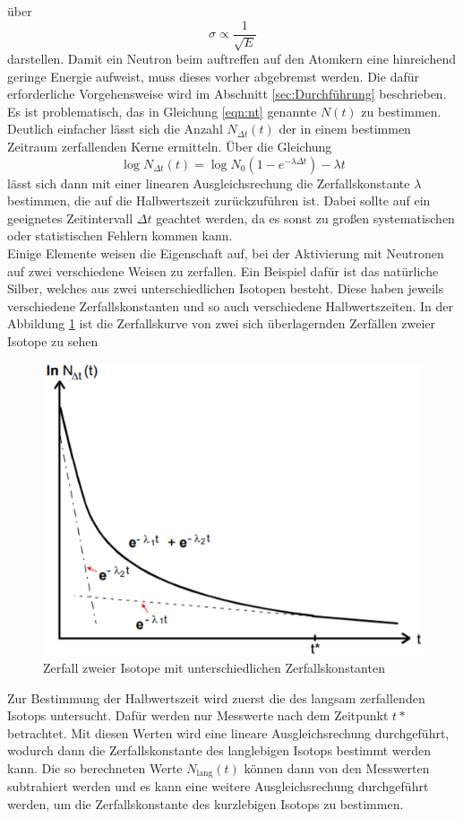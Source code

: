 über 
\begin{equation}
    \sigma \propto \frac{1}{\sqrt{E}}
\end{equation}
darstellen.
Damit ein Neutron beim auftreffen auf den Atomkern eine hinreichend geringe Energie aufweist, muss dieses vorher abgebremst werden.
Die dafür erforderliche Vorgehensweise wird im Abschnitt \ref{sec:Durchführung} beschrieben.
\\
Es ist problematisch, das in Gleichung \ref{eqn:nt} genannte $N(t)$ zu bestimmen. Deutlich einfacher lässt sich die Anzahl 
$N_{\Delta t}(t)$ der in einem bestimmen Zeitraum zerfallenden Kerne ermitteln. Über die Gleichung 
\begin{equation}
    \log{N_{\Delta t}(t)} = \log{N_0}(1 - e^{-\lambda\Delta t}) -\lambda t
\end{equation}
lässt sich dann mit einer linearen Ausgleichsrechung die Zerfallskonstante $\lambda$ bestimmen, die auf die Halbwertszeit
zurückzuführen ist. Dabei sollte auf ein geeignetes Zeitintervall $\Delta t$ geachtet werden, da es sonst zu großen systematischen
oder statistischen Fehlern kommen kann. 
\\
Einige Elemente weisen die Eigenschaft auf, bei der Aktivierung mit Neutronen auf zwei verschiedene Weisen zu zerfallen. Ein 
Beispiel dafür ist das natürliche Silber, welches aus zwei unterschiedlichen Isotopen besteht. Diese haben jeweils verschiedene
Zerfallskonstanten und so auch verschiedene Halbwertszeiten. In der Abbildung \ref{fig:2iso} ist die Zerfallskurve von zwei
sich überlagernden Zerfällen zweier Isotope zu sehen 
\begin{figure}
    \centering
    \includegraphics[width=\textwidth]{data/zerfall.png}
    \caption{Zerfall zweier Isotope mit unterschiedlichen Zerfallskonstanten}
    \label{fig:2iso}
\end{figure}
Zur Bestimmung der Halbwertszeit wird zuerst die des langsam zerfallenden Isotops untersucht. Dafür werden nur Messwerte nach dem 
Zeitpunkt $t*$ betrachtet. Mit diesen Werten wird eine lineare Ausgleichsrechung durchgeführt, wodurch dann die Zerfallskonstante
des langlebigen Isotops bestimmt werden kann. Die so berechneten Werte $N_\text{lang}(t)$ können dann von den Messwerten 
subtrahiert werden und es kann eine weitere Ausgleichsrechung durchgeführt werden, um die Zerfallskonstante des kurzlebigen
Isotops zu bestimmen. 